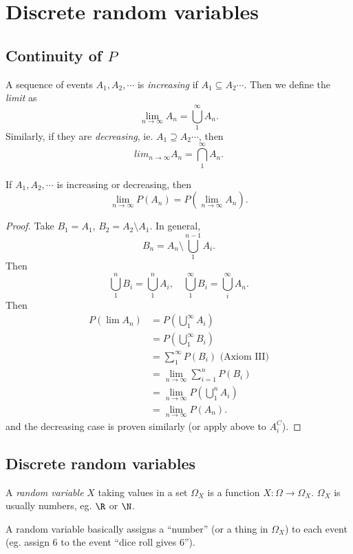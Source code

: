 \documentclass[a4paper]{article}
\begin{document}
\section{Discrete random variables}
\subsection{Continuity of $P$}
\begin{defi}
  A sequence of events $A_1, A_2, \cdots$ is \emph{increasing} if $A_1 \subseteq A_2 \cdots$. Then we define the \emph{limit} as
  \[
    \lim_{n\to \infty} A_n = \bigcup_{1}^\infty A_n.
  \]
  Similarly, if they are \emph{decreasing}, ie. $A_1\supseteq A_2\cdots$, then
  \[
    lim_{n\to \infty} A_n = \bigcap_{1}^\infty A_n.
  \]
\end{defi}

\begin{thm}
  If $A_1, A_2, \cdots$ is increasing or decreasing, then
  \[
    \lim_{n\to \infty} P(A_n) = P\left(\lim_{n\to \infty} A_n\right).
  \]
\end{thm}

\begin{proof}
  Take $B_1 = A_1$, $B_2 = A_2\setminus A_1$. In general,
  \[
    B_n = A_n\setminus\bigcup_1^{n - 1}A_i.
  \]
  Then
  \[
    \bigcup_1^n B_i = \bigcup_1^n A_i,\quad \bigcup_1^\infty B_i = \bigcup _i^\infty A_n.
  \]
  Then
  \begin{align*}
    P(\lim A_n) &= P\left(\bigcup_1^\infty A_i\right)\\
  &= P\left(\bigcup_1^\infty B_i\right)\\
  &=\sum_1^\infty P(B_i)\text{ (Axiom III)}\\
  &= \lim_{n \to \infty}\sum_{i = 1}^n P(B_i)\\
  &= \lim_{n \to \infty} P\left(\bigcup_1^n A_i\right)\\
  &= \lim_{n \to \infty} P(A_n).
  \end{align*}
  and the decreasing case is proven similarly (or apply above to $A_i^C$).
\end{proof}
\subsection{Discrete random variables}
\begin{defi}
  A \emph{random variable} $X$ taking values in a set $\Omega_X$ is a function $X: \Omega \to \Omega_X$. $\Omega_X$ is usually numbers, eg. $\R$ or $\N$.

  A random variable basically assigns a ``number'' (or a thing in $\Omega_X$) to each event (eg. assign $6$ to the event ``dice roll gives 6'').
\end{defi}
\end{document}

